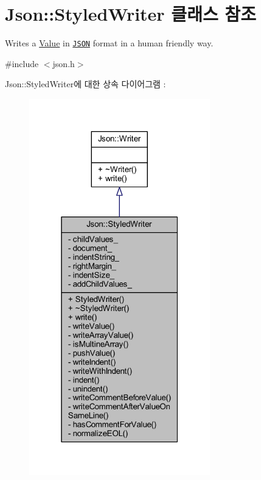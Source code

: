 \hypertarget{class_json_1_1_styled_writer}{}\section{Json\+:\+:Styled\+Writer 클래스 참조}
\label{class_json_1_1_styled_writer}


Writes a \hyperlink{class_json_1_1_value}{Value} in \href{http://www.json.org}{\tt J\+S\+ON} format in a human friendly way.  




{\ttfamily \#include $<$json.\+h$>$}



Json\+:\+:Styled\+Writer에 대한 상속 다이어그램 \+: \nopagebreak
\begin{figure}[H]
\begin{center}
\leavevmode
\includegraphics[width=223pt]{class_json_1_1_styled_writer__inherit__graph}
\end{center}
\end{figure}


